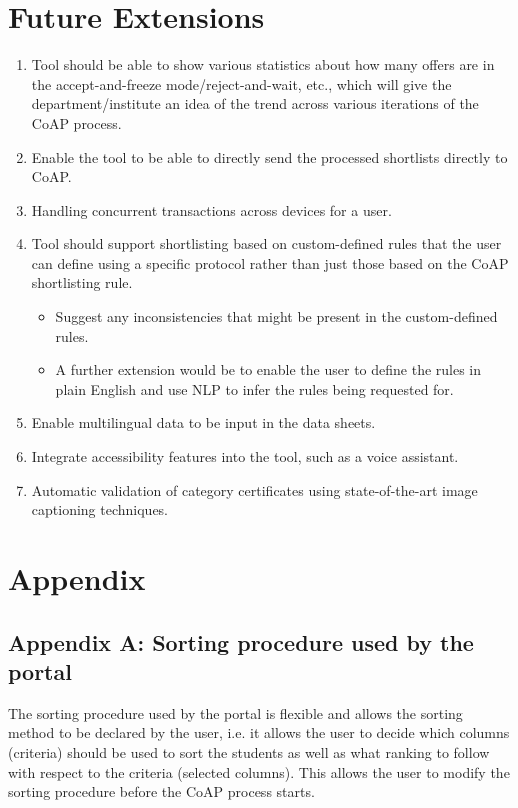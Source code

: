 \documentclass{report}
\begin{document}
\chapter{Future Extensions}
\begin{tcolorbox}[colframe=white, colback=lightgreen, arc=8pt]
\begin{enumerate}
    \item Tool should be able to show various statistics about how many offers are in the accept-and-freeze mode/reject-and-wait, etc., which will give the department/institute an idea of the trend across various iterations of the CoAP process. 
    \item Enable the tool to be able to directly send the processed shortlists directly to CoAP.
    \item Handling concurrent transactions across devices for a user.
    \item Tool should support shortlisting based on custom-defined rules that the user can define using a specific protocol rather than just those based on the CoAP shortlisting rule.
\begin{itemize}
    \item Suggest any inconsistencies that might be present in the custom-defined rules.
    \item A further extension would be to enable the user to define the rules in plain English and use NLP to infer the rules being requested for.
\end{itemize}
    \item Enable multilingual data to be input in the data sheets.
    \item Integrate accessibility features into the tool, such as a voice assistant.
    \item Automatic validation of category certificates using state-of-the-art image captioning  techniques.
\end{enumerate}
\end{tcolorbox}
\chapter{Appendix}
\section{Appendix A: Sorting procedure used by the portal}\label{Appendix A}
The sorting procedure used by the portal is flexible and allows the sorting method to be declared by the user, i.e. it allows the user to decide which columns (criteria) should be used to sort the students as well as what ranking to follow with respect to the criteria (selected columns). This allows the user to modify the sorting procedure before the CoAP process starts.
\end{document}
